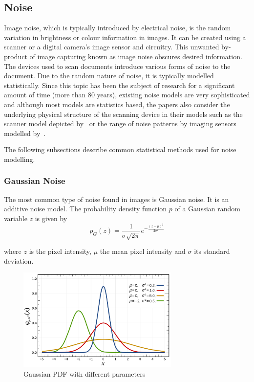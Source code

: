 \documentclass[a4paper, 12pt]{report}
\begin{document}
\subsection{Noise}
Image noise, which is typically introduced by electrical noise, is the random variation in brightness or colour information in images. It can be created using a scanner or a digital camera's image sensor and circuitry. This unwanted by-product of image capturing known as image noise obscures desired information. The devices used to scan documents introduce various forms of noise to the document. Due to the random nature of noise, it is typically modelled statistically. Since this topic has been the subject of research for a significant amount of time (more than 80 years), existing noise models are very sophisticated and although most models are statistics based, the papers also consider the underlying physical structure of the scanning device in their models such as the scanner model depicted by~\cite{gou2007robust} or the range of noise patterns by imaging sensors modelled by~\cite{lukas2006digital}.\par

The following subsections describe common statistical methods used for noise modelling.

\subsubsection{Gaussian Noise}
The most common type of noise found in images is Gaussian noise. It is an additive noise model.  The probability density function \(p\) of a Gaussian random variable \(z\) is given by
\[p_{G}(z)=\frac {1}{\sigma {\sqrt {2\pi }}}e^{-{\frac {(z-\mu )^{2}}{2\sigma ^{2}}}}\]

where \(z\) is the pixel intensity, \(\mu\) the mean pixel intensity and \(\sigma\) its standard deviation.

\begin{figure}[ht]
    \centering
    \includegraphics[width=8cm]{gaussian distribution.png}
    \caption{Gaussian PDF with different parameters~\cite{gaussian_image}}
    \label{fig:gaussian_image}
\end{figure}
\end{document}

